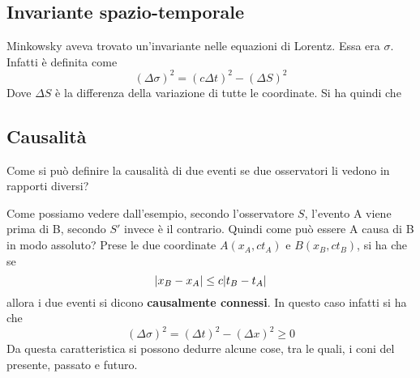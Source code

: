 \subsection{Invariante spazio-temporale}
Minkowsky aveva trovato un'invariante nelle equazioni di Lorentz. Essa era $\sigma$. Infatti è
definita come
\begin{equation*}
  {(\Delta\sigma)}^2={(c\Delta t)}^2-{(\Delta S)}^2
\end{equation*}
Dove $\Delta S$ è la differenza della variazione di tutte le coordinate. Si ha quindi che

\subsection{Causalità}
Come si può definire la causalità di due eventi se due osservatori li vedono in rapporti diversi?
\begin{center}
\end{center}
Come possiamo vedere dall'esempio, secondo l'osservatore $S$, l'evento A viene prima di B, secondo
$S'$ invece è il contrario. Quindi come può essere A causa di B in modo assoluto? Prese le due
coordinate $A(x_A,ct_A)$ e $B(x_B,ct_B)$, si ha che se 
\begin{equation*}
  \lvert x_B-x_A\rvert\leq c\lvert t_B-t_A\rvert
\end{equation*}
allora i due eventi si dicono \textbf{causalmente connessi}. In questo caso infatti si ha che
\begin{equation*}
  \left( \Delta\sigma \right)^2=\left( \Delta t \right)^2-\left( \Delta x \right)^2\geq0
\end{equation*}
Da questa caratteristica si possono dedurre alcune cose, tra le quali, i coni del presente, 
passato e futuro.
\begin{center}
\end{center}
